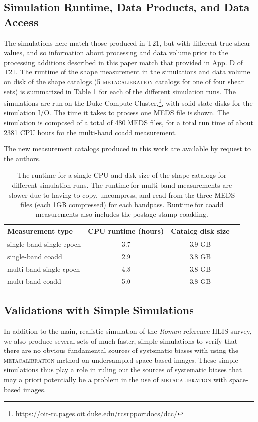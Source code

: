 \documentclass[fleqn,usenatbib]{mnras}
\begin{document}
\subsection{Simulation Runtime, Data Products, and Data Access}
The simulations here match those produced in T21, but with different true shear values, and so information about processing and data volume prior to the processing additions described in this paper match that provided in App. D of T21.
The runtime of the shape measurement in the simulations and data volume on disk of the shape catalogs (5 \textsc{metacalibration} catalogs for one of four shear sets) is summarized in Table \ref{tab:data} for each of the different simulation runs. The simulations are run on the Duke Compute Cluster,\footnote{\url{https://oit-rc.pages.oit.duke.edu/rcsupportdocs/dcc/}}, with solid-state disks for the simulation I/O. The time it takes to process one MEDS file is shown. The simulation is composed of a total of 480 MEDS files, for a total run time of about 2381 CPU hours for the multi-band coadd measurement.

The new measurement catalogs produced in this work are available by request to the authors.
\begin{table}
    \centering
    \begin{tabular}[width=\columnwidth]{l|c|c|c}
    \hline
    Measurement type &  CPU runtime (hours) & Catalog disk size  \\
    \hline 
    single-band single-epoch  & 3.7 & 3.9 GB \\
    single-band coadd  & 2.9 & 3.8 GB \\
    multi-band single-epoch  & 4.8 & 3.8 GB \\
    multi-band coadd  & 5.0 & 3.8 GB \\
    \hline
    \end{tabular}
    \caption{The runtime for a single CPU and disk size of the shape catalogs for different simulation runs. The runtime for multi-band measurements are slower due to having to copy, uncompress, and read from the three MEDS files (each 1GB compressed) for each bandpass. Runtime for coadd measurements also includes the postage-stamp coadding.}
    \label{tab:data}
\end{table}

\subsection{Validations with Simple Simulations}
\label{subsec:simplesim}
In addition to the main, realistic simulation of the \emph{Roman} reference HLIS survey, we also produce several sets of much faster, simple simulations  to verify that there are no obvious fundamental sources of systematic biases with using the \textsc{metacalibration} method on undersampled space-based images. These simple simulations thus play a role in ruling out the sources of systematic biases that may a priori  potentially be a problem in the use of \textsc{metacalibration} with space-based images. 
\end{document}
